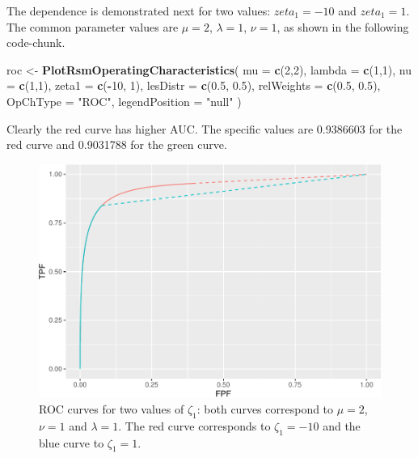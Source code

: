 \documentclass[
]{book}
\newenvironment{Shaded}{\begin{snugshade}}{\end{snugshade}}
\newcommand{\DataTypeTok}[1]{\textcolor[rgb]{0.13,0.29,0.53}{#1}}
\newcommand{\DecValTok}[1]{\textcolor[rgb]{0.00,0.00,0.81}{#1}}
\newcommand{\FloatTok}[1]{\textcolor[rgb]{0.00,0.00,0.81}{#1}}
\newcommand{\KeywordTok}[1]{\textcolor[rgb]{0.13,0.29,0.53}{\textbf{#1}}}
\newcommand{\NormalTok}[1]{#1}
\newcommand{\OperatorTok}[1]{\textcolor[rgb]{0.81,0.36,0.00}{\textbf{#1}}}
\newcommand{\StringTok}[1]{\textcolor[rgb]{0.31,0.60,0.02}{#1}}
\begin{document}
The dependence is demonstrated next for two values: \(zeta_1 = -10\) and \(zeta_1 = 1\). The common parameter values are \(\mu = 2\), \(\lambda = 1\), \(\nu = 1\), as shown in the following code-chunk.

\begin{Shaded}
\begin{Highlighting}[]
\NormalTok{roc <-}\StringTok{ }\KeywordTok{PlotRsmOperatingCharacteristics}\NormalTok{(}
     \DataTypeTok{mu =} \KeywordTok{c}\NormalTok{(}\DecValTok{2}\NormalTok{,}\DecValTok{2}\NormalTok{),}
     \DataTypeTok{lambda =} \KeywordTok{c}\NormalTok{(}\DecValTok{1}\NormalTok{,}\DecValTok{1}\NormalTok{),}
     \DataTypeTok{nu =} \KeywordTok{c}\NormalTok{(}\DecValTok{1}\NormalTok{,}\DecValTok{1}\NormalTok{),}
     \DataTypeTok{zeta1 =} \KeywordTok{c}\NormalTok{(}\OperatorTok{-}\DecValTok{10}\NormalTok{, }\DecValTok{1}\NormalTok{),}
     \DataTypeTok{lesDistr =} \KeywordTok{c}\NormalTok{(}\FloatTok{0.5}\NormalTok{, }\FloatTok{0.5}\NormalTok{),}
     \DataTypeTok{relWeights =} \KeywordTok{c}\NormalTok{(}\FloatTok{0.5}\NormalTok{, }\FloatTok{0.5}\NormalTok{),}
     \DataTypeTok{OpChType =} \StringTok{"ROC"}\NormalTok{,}
     \DataTypeTok{legendPosition =} \StringTok{"null"}
\NormalTok{)}
\end{Highlighting}
\end{Shaded}

Clearly the red curve has higher AUC. The specific values are 0.9386603 for the red curve and 0.9031788 for the green curve.

\begin{figure}
\centering
\includegraphics{17a-rsm-predictions_files/figure-latex/rsm-pred-roc-zeta1-1.pdf}
\caption{\label{fig:rsm-pred-roc-zeta1}ROC curves for two values of \(\zeta_1\): both curves correspond to \(\mu = 2\), \(\nu = 1\) and \(\lambda = 1\). The red curve corresponds to \(\zeta_1 = -10\) and the blue curve to \(\zeta_1 = 1\).}
\end{figure}
\end{document}
